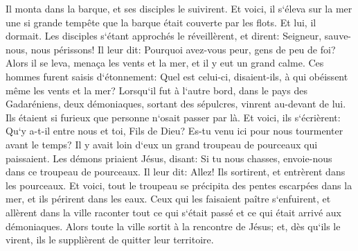\verse Il monta dans la barque, et ses disciples le suivirent. 
\verse Et voici, il s`éleva sur la mer une si grande tempête que la barque était couverte par les flots. Et lui, il dormait. 
\verse Les disciples s`étant approchés le réveillèrent, et dirent: Seigneur, sauve-nous, nous périssons! 
\verse Il leur dit: Pourquoi avez-vous peur, gens de peu de foi? Alors il se leva, menaça les vents et la mer, et il y eut un grand calme. 
\verse Ces hommes furent saisis d`étonnement: Quel est celui-ci, disaient-ils, à qui obéissent même les vents et la mer? 
\verse Lorsqu`il fut à l`autre bord, dans le pays des Gadaréniens, deux démoniaques, sortant des sépulcres, vinrent au-devant de lui. Ils étaient si furieux que personne n`osait passer par là. 
\verse Et voici, ils s`écrièrent: Qu`y a-t-il entre nous et toi, Fils de Dieu? Es-tu venu ici pour nous tourmenter avant le temps? 
\verse Il y avait loin d`eux un grand troupeau de pourceaux qui paissaient. 
\verse Les démons priaient Jésus, disant: Si tu nous chasses, envoie-nous dans ce troupeau de pourceaux. 
\verse Il leur dit: Allez! Ils sortirent, et entrèrent dans les pourceaux. Et voici, tout le troupeau se précipita des pentes escarpées dans la mer, et ils périrent dans les eaux. 
\verse Ceux qui les faisaient paître s`enfuirent, et allèrent dans la ville raconter tout ce qui s`était passé et ce qui était arrivé aux démoniaques. 
\verse Alors toute la ville sortit à la rencontre de Jésus; et, dès qu`ils le virent, ils le supplièrent de quitter leur territoire. 

\chapter{}

